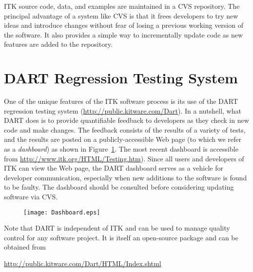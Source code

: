 ITK source code, data, and examples are maintained in a CVS repository.  The
principal advantage of a system like CVS is that it frees developers to try
new ideas and introduce changes without fear of losing a previous working
version of the software. It also provides a simple way to incrementally
update code as new features are added to the repository.



\section{DART Regression Testing System}
\label{sec:DART}
\label{sec:QualityDashboard}


One of the unique features of the ITK software process is its use of the DART
regression testing system (\url{http://public.kitware.com/Dart}). In a
nutshell, what DART does is to provide quantifiable feedback to developers as
they check in new code and make changes. The feedback consists of the results
of a variety of tests, and the results are posted on a publicly-accessible
Web page (to which we refer as a \emph{dashboard}) as shown in
Figure~\ref{fig:Dashboard}. The most recent dashboard is accessible from
\url{http://www.itk.org/HTML/Testing.htm}). Since all users and developers of
ITK can view the Web page, the DART dashboard serves as a vehicle for
developer communication, especially when new additions to the software is
found to be faulty.  The dashboard should be consulted before considering
updating software via CVS.


\begin{figure}[ht]
\centering 
\texttt{[image: Dashboard.eps]}
\label{fig:Dashboard}
\end{figure}

Note that DART is independent of ITK and can be used to manage quality
control for any software project. It is itself an open-source package and can
be obtained from

\begin{center} 
\url{http://public.kitware.com/Dart/HTML/Index.shtml}
\end{center} 


